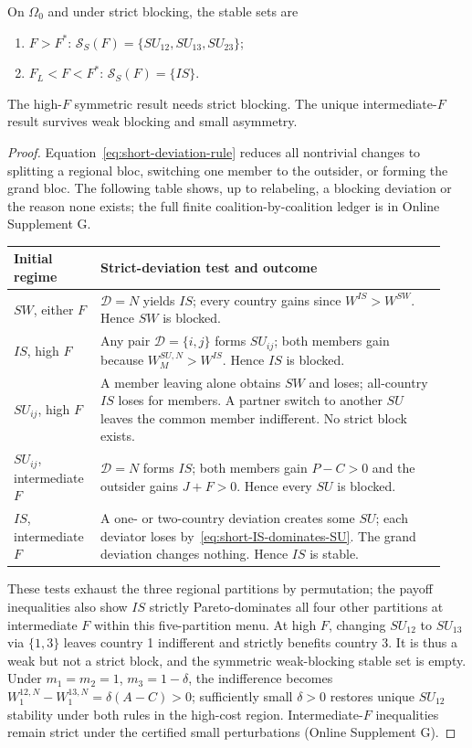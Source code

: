 \begin{theorem}\label{thm:short-stability}
On $\Omega_0$ and under strict blocking, the stable sets are
\begin{enumerate}
\item $F>F^*$: $\mathcal S_S(F)=\{SU_{12},SU_{13},SU_{23}\}$;
\item $F_L<F<F^*$: $\mathcal S_S(F)=\{IS\}$.
\end{enumerate}
The high-$F$ symmetric result needs strict blocking. The unique
intermediate-$F$ result survives weak blocking and small asymmetry.
\end{theorem}

\begin{proof}
Equation~\eqref{eq:short-deviation-rule} reduces all nontrivial changes to
splitting a regional bloc, switching one member to the outsider, or forming the
grand bloc. The following table shows, up to relabeling, a blocking deviation
or the reason none exists; the full finite coalition-by-coalition ledger is in
Online Supplement G.
\begin{center}
\small
\renewcommand{\arraystretch}{1.18}
\begin{tabular}{@{}p{0.18\linewidth}p{0.76\linewidth}@{}}
\toprule
Initial regime & Strict-deviation test and outcome \\
\midrule
$SW$, either $F$ & $\mathcal D=N$ yields $IS$; every country gains since $W^{IS}>W^{SW}$. Hence $SW$ is blocked. \\
$IS$, high $F$ & Any pair $\mathcal D=\{i,j\}$ forms $SU_{ij}$; both members gain because $W_M^{SU,N}>W^{IS}$. Hence $IS$ is blocked. \\
$SU_{ij}$, high $F$ & A member leaving alone obtains $SW$ and loses; all-country $IS$ loses for members. A partner switch to another $SU$ leaves the common member indifferent. No strict block exists. \\
$SU_{ij}$, intermediate $F$ & $\mathcal D=N$ forms $IS$; both members gain $P-C>0$ and the outsider gains $J+F>0$. Hence every $SU$ is blocked. \\
$IS$, intermediate $F$ & A one- or two-country deviation creates some $SU$; each deviator loses by~\eqref{eq:short-IS-dominates-SU}. The grand deviation changes nothing. Hence $IS$ is stable. \\
\bottomrule
\end{tabular}
\end{center}
These tests exhaust the three regional partitions by permutation; the payoff
inequalities also show $IS$ strictly Pareto-dominates all four other partitions
at intermediate $F$ within this five-partition menu. At high $F$, changing
$SU_{12}$ to $SU_{13}$ via $\{1,3\}$ leaves country 1 indifferent and
strictly benefits country 3. It is thus a weak but not a strict block,
and the symmetric weak-blocking stable set is empty. Under
$m_1=m_2=1$, $m_3=1-\delta$, the indifference becomes
$W_1^{12,N}-W_1^{13,N}=\delta(A-C)>0$; sufficiently small
$\delta>0$ restores unique $SU_{12}$ stability under both rules in the
high-cost region. Intermediate-$F$ inequalities remain strict under the
certified small perturbations (Online Supplement G).
\end{proof}

